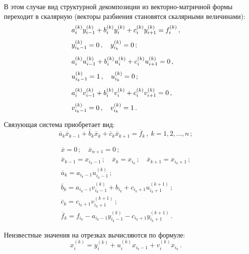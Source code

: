 \begin{multicols}{2}
     В этом случае вид структурной декомпозиции из векторно-матричной
формы переходит в скалярную (векторы разбиения становятся скалярными
величинами):
     \begin{align}
&     a_i^{(k)} y_{i-1}^{(k)} +b_i^{(k)}y_i^{(k)} +c_i^{(k)} y_{i+1}^{(k)}  =
f_i^{(k)}\,,\notag\\[-6pt]
     & \label{e13ol}\\[-6pt]
 &    y^{(k)}_{i_k-1}  =0\,,\quad y_{i_k}^{(k)} =0\,;\notag\\[6pt]
&     a_i^{(k)} u_{i-1}^{(k)} +b_i^{(k)}u_i^{(k)} +c_i^{(k)} u_{i+1}^{(k)}  =
0\,,\notag\\[-6pt]
     & \label{e14ol}\\[-6pt]
&     u^{(k)}_{i_k-1}  =1\,,\quad u_{i_k}^{(k)} =0\,;\notag\\[6pt]
 &    a_i^{(k)} v_{i-1}^{(k)} +b_i^{(k)}v_i^{(k)} +c_i^{(k)} v_{i+1}^{(k)}  =
0\,,\notag\\[-6pt]
     & \label{e15ol}\\[-6pt]
&     v^{(k)}_{i_k-1}  =0\,,\quad v_{i_k}^{(k)} =1\,.\notag
     \end{align}

     Связующая система приобретает вид:
     \begin{equation}
     \overline{a}_k \overline{x}_{k-1} +\overline{b}_k\overline{x}_k
+\overline{c}_k\overline{x}_{k+1} = \overline{f}_k\,,\ k=1, 2, \ldots , n\,;
     \label{e16ol}
     \end{equation}
     \vspace*{-9pt}
     
     \noindent
     \begin{gather*}
        \overline{x} =0\,;\quad \overline{x}_{n+1} =0\,;\\[2pt]
        \overline{x}_{k-1} = x_{i_k-1}\,;\quad \overline{x}_k = x_{i_k}\,;\quad \overline{x}_{k+1} = x_{i_k+1}\,;\\[2pt]
        \overline{a}_k = a_{i_k-1}u_{i_k-1}^{(k)}\,;\\[2pt]
     \overline{b}_k = a_{i_k-1} v^{(k)}_{i_k-1} +b_{i_k} +c_{i_k+1}
u^{(k+1)}_{i_k+1}\,;\\[2pt]
     \overline{c}_k = c_{i_k+1} v^{(k+1)}_{i_k+1}\,;\\[2pt]
     \overline{f}_k =  f_{i_k} -a_{i_k-1} y^{(k)}_{i_k-1} - c_{i_k+1}
y^{(k+1)}_{i_k+1}\,.
     \end{gather*}

     Неизвестные значения на отрезках вычисляются по формуле:
     \begin{equation}
     x_i^{(k)} = y_i^{(k)} +u_i^{(k)} x_{i_k-1} +v_i^{(k)} x_{i_k}\,.
     \label{e17ol}
     \end{equation}


\end{multicols}
